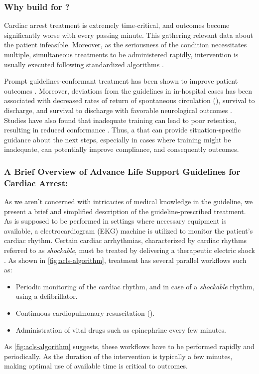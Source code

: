 \subsubsection{Why build \CDSSs{} for \ACLS{}?}

Cardiac arrest treatment is extremely time-critical, and outcomes
become significantly worse with every passing minute. This
gathering relevant data about the patient infeasible. Moreover, as
the seriousness of the condition necessitates multiple, simultaneous treatments
to be administered rapidly, intervention is usually executed following
standardized \ACLS{} algorithms \cite{ACLSWikiEntry}.

Prompt \ACLS{} guidelines-conformant treatment has been
shown to improve patient outcomes \cite{HonarmandResuscitation18}.
Moreover, deviations from the guidelines in in-hospital cases has been
associated with decreased rates of return of spontaneous circulation (\ROSC{}),
survival to discharge, and survival to discharge with favorable neurological
outcomes \cite{CrowleyResuscitation20}. Studies have also found that
inadequate \ACLS{} training can lead to poor retention, resulting
in reduced \ACLS{} conformance \cite{KiddJCN07}. Thus,
a \CDSS{} that can provide situation-specific guidance about
the next steps, especially in cases where \HCP{} training might be inadequate,
can potentially improve compliance, and consequently outcomes.

\subsubsection{A Brief Overview of Advance Life Support Guidelines for Cardiac Arrest:}

As we aren't concerned with intricacies of medical knowledge in the guideline,
we present a brief and simplified description of the guideline-prescribed treatment.
As \ACLS{} is supposed to be performed in settings where necessary equipment is
available, a electrocardiogram (EKG) machine is utilized to
monitor the patient's cardiac rhythm. Certain cardiac arrhythmias, characterized
by cardiac rhythms referred to as \emph{shockable}, must be treated
by delivering a therapeutic electric shock
\cite{DefibrillationWikiEntry}. As shown in \autoref{fig:acls-algorithm},
treatment has several parallel workflows such as:
\begin{itemize}
  \item Periodic monitoring of the cardiac rhythm, and in case of a
    \emph{shockable} rhythm, using a defibrillator.
  \item Continuous cardiopulmonary resuscitation (\CPR{}).
  \item Administration of vital drugs such as
    epinephrine every few minutes.
\end{itemize}
As \autoref{fig:acls-algorithm} suggests, these workflows have to be
performed rapidly and periodically. As the duration of the intervention
is typically a few minutes, making optimal use of available time is critical to
outcomes.

